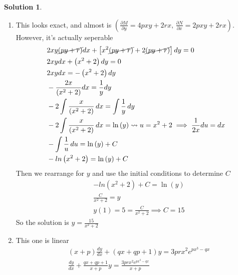 \documentclass[10pt]{article}
\theoremstyle{definition}
\newtheorem{soln}{Solution}
\begin{document}
\begin{soln} ~\\
  \begin{enumerate}[label=(\alph*)]
    \item This looks exact, and almost is $\left(\displaystyle\frac{\partial M}{\partial y}=4pxy+2rx,\,\displaystyle\frac{\partial N}{\partial x}=2pxy+2rx\right)$. However, it's actually seperable
          \begin{align*}
             & 2xy\cancel{\left(py+r\right)}dx+\left[x^2\cancel{\left(py+r\right)}+2\cancel{\left(py+r\right)}\right]dy=0   \\
             & 2xydx+\left(x^2+2\right)dy=0                                                                                 \\
             & 2xydx=-\left(x^2+2\right)dy                                                                                  \\
             & -\frac{2x}{\left(x^2+2\right)}dx=\frac{1}{y}dy                                                               \\
             & -2\int \frac{x}{\left(x^2+2\right)}\, dx=\int\frac{1}{y}\,dy                                                 \\
             & -2\int \frac{x}{\left(x^2+2\right)}\, dx=\ln\left(y\right) \rightsquigarrow u=x^2+2\implies\frac{1}{2x}du=dx \\
             & -\int \frac{1}{u}\, du=\ln\left(y\right) + C                                                                 \\
             & -ln\left(x^2+2\right)=\ln\left(y\right) + C 
          \end{align*}
          Then we rearrange for $y$ and use the initial conditions to determine $C$
          \begin{align*}
             & -ln\left(x^2+2\right) + C=\ln\left(y\right) \\
             & \frac{C}{x^2+2}=y                           \\
             & y(1)=5=\frac{C}{x^2+2} \implies C=15
          \end{align*}
          So the solution is $y=\displaystyle\frac{15}{x^2+2}$
    \item This one is linear
          \begin{align*}
             & (x+p)\frac{dy}{dx}+(qx+qp+1)y=3prx^2e^{px^3-qx}                  \\
             & \frac{dy}{dx}+\frac{qx+qp+1}{x+p}y=\frac{3prx^2e^{px^3-qx}}{x+p} \\

\end{align*}
\end{enumerate}
\end{soln}
\end{document}
